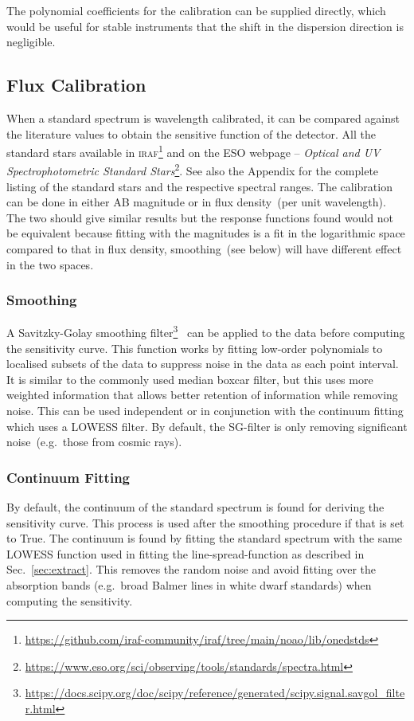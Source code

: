 \documentclass[fleqn,usenatbib]{mnras}
\begin{document}
The polynomial coefficients for the calibration can be supplied
directly, which would be useful for stable instruments that
the shift in the dispersion direction is negligible.

\subsection{Flux Calibration}
When a standard spectrum is wavelength calibrated, it can be
compared against the literature values to obtain the sensitive
function of the detector. All the standard stars available in
\textsc{iraf}\footnote{\url{https://github.com/iraf-community/iraf/tree/main/noao/lib/onedstds}}
and on the ESO webpage -- \textit{Optical and UV Spectrophotometric
Standard Stars}\footnote{\url{https://www.eso.org/sci/observing/tools/standards/spectra.html}}.
See also the Appendix for the complete listing of the standard
stars and the respective spectral ranges.
The calibration can be done in either AB magnitude or in
flux density~(per unit wavelength). The two should give similar
results but the response functions found would not be equivalent
because fitting with the magnitudes is a fit in the logarithmic
space compared to that in flux density, smoothing~(see below)
will have different effect in the two spaces.

\subsubsection*{Smoothing}
A Savitzky-Golay smoothing
filter\footnote{\url{https://docs.scipy.org/doc/scipy/reference/generated/scipy.signal.savgol_filter.html}}~\citep[hereafter, SG-filter]{1964AnaCh..36.1627S}
can be applied to the data before computing the sensitivity curve.
This function works by fitting low-order polynomials to localised
subsets of the data to suppress noise in the data as each point
interval. It is similar to the commonly used median boxcar filter,
but this uses more weighted information that allows better
retention of information while removing noise. This can be
used independent or in conjunction with the continuum fitting which
uses a LOWESS filter. By default, the SG-filter is only removing
significant noise~(e.g.\ those from cosmic rays).

\subsubsection*{Continuum Fitting}
By default, the continuum of the standard spectrum is found for
deriving the sensitivity curve. This process is used after the
smoothing procedure if that is set to True. The continuum is found
by fitting the standard spectrum with the same LOWESS function
used in fitting the line-spread-function as described in
Sec.~\ref{sec:extract}. This removes the random noise and avoid
fitting over the absorption bands (e.g.\ broad Balmer lines in
white dwarf standards) when computing the sensitivity.
\end{document}
